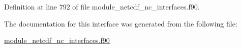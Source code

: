 Definition at line 792 of file module\+\_\+netcdf\+\_\+nc\+\_\+interfaces.\+f90.



The documentation for this interface was generated from the following file\+:\begin{DoxyCompactItemize}
\item 
\hyperlink{module__netcdf__nc__interfaces_8f90}{module\+\_\+netcdf\+\_\+nc\+\_\+interfaces.\+f90}\end{DoxyCompactItemize}
